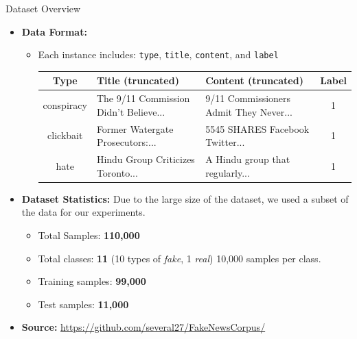 \documentclass{beamer}
\begin{document}
\begin{frame}{Dataset Overview}
    \begin{itemize}
        \item \textbf{Data Format:}
        \begin{itemize}
            \item Each instance includes: \texttt{type}, \texttt{title}, \texttt{content}, and \texttt{label}
            \tiny
            \begin{tabular}{|c|p{2cm}|p{3.2cm}|c|}
                \hline
                \textbf{Type} & \textbf{Title (truncated)} & \textbf{Content (truncated)} & \textbf{Label} \\
                \hline
                conspiracy & The 9/11 Commission Didn’t Believe... & 9/11 Commissioners Admit They Never... & 1 \\
                clickbait & Former Watergate Prosecutors:... & 5545 SHARES Facebook Twitter... & 1 \\
                hate & Hindu Group Criticizes Toronto... & A Hindu group that regularly... & 1 \\
                \hline
            \end{tabular}
            \normalsize
    
        \end{itemize}
        
        

        
        \vspace{0.4cm}
        
        \item \textbf{Dataset Statistics:}
        Due to the large size of the dataset, we used a subset of the data for our experiments.
        \begin{itemize}
            \item Total Samples: \textbf{110,000}
            \item Total classes: \textbf{11} (10 types of \textit{fake}, 1 \textit{real}) 10,000 samples per class.
            \item Training samples: \textbf{99,000}
            \item Test samples: \textbf{11,000}
        \end{itemize}

        \item \textbf{Source:} \url{https://github.com/several27/FakeNewsCorpus/}
    \end{itemize}
\end{frame}
\end{document}
